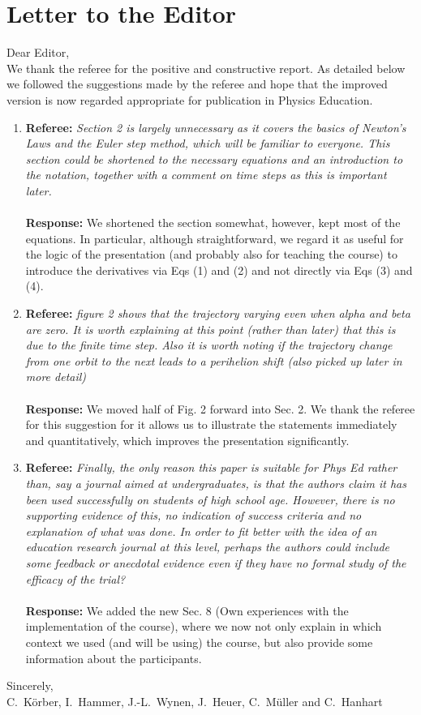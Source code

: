 \documentclass{article}
\begin{document}

\section*{Letter to the Editor}

\noindent
Dear Editor, \\

We thank the referee for the positive and constructive report.
As detailed below we followed the suggestions made by the referee and hope that the improved version is now regarded appropriate for publication in Physics Education.

\begin{enumerate}
\item \textbf{Referee:} 
\textit{
Section 2 is largely unnecessary as it covers the basics of Newton's Laws and the Euler step method, which will be familiar to everyone.
This section could be shortened to the necessary equations and an introduction to the notation, together with a comment on time steps as this is important later.
}
\\
\\
\textbf{Response:}
We shortened the section somewhat, however, kept most of the equations. In particular, although straightforward, we regard it as useful for the logic of the presentation (and probably also for teaching the course) to introduce the derivatives via Eqs (1) and (2) and not directly via Eqs (3) and (4).


\item \textbf{Referee:} 
\textit{
figure 2 shows that the trajectory varying even when alpha and beta are zero.
It is worth explaining at this point (rather than later) that this is due to the finite time step.
Also it is worth noting if the trajectory change from one orbit to the next leads to a perihelion shift (also picked up later in more detail)
}
\\
\\
\textbf{Response:}
We moved half of Fig. 2 forward into Sec. 2. We thank the referee for this suggestion for it allows us to illustrate the statements immediately and quantitatively, which improves the presentation significantly.


\item \textbf{Referee:} 
\textit{
Finally, the only reason this paper is suitable for Phys Ed rather than, say a journal aimed at undergraduates, is that the authors claim it has been used successfully on students of high school age.
However, there is no supporting evidence of this, no indication of success criteria and no explanation of what was done.
In order to fit better with the idea of an education research journal at this level, perhaps the authors could include some feedback or anecdotal evidence even if they have no formal study of the efficacy of the trial?
}
\\
\\
\textbf{Response:}
We added the new Sec. 8 (Own experiences with the implementation of the course), where we now not only explain in which context we used (and will be using) the course, but also provide some information about the participants.

\end{enumerate}

\noindent
Sincerely,\\

	C.~K\"orber,
	I.~Hammer,
	J.-L.~Wynen,
	J.~Heuer,
	C.~M\"uller and
	C.~Hanhart
\newpage
\end{document}
